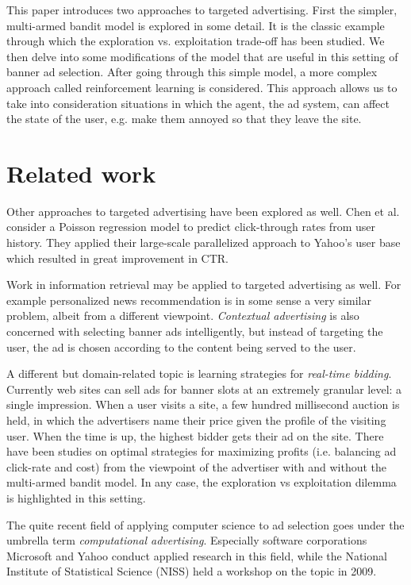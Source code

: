 \documentclass{article} %
\begin{document}

This paper introduces two approaches to targeted advertising. First the
simpler, multi-armed bandit model is explored in some detail. It is the classic
example through which the exploration vs.  exploitation trade-off has been
studied. We then delve into some modifications of the model that are useful in
this setting of banner ad selection. After going through this simple model, a
more complex approach called reinforcement learning is considered. This
approach allows us to take into consideration situations in which the agent,
the ad system, can affect the state of the user, e.g. make them annoyed so that
they leave the site.

\section{Related work}

Other approaches to targeted advertising have been explored as well. Chen et
al. \cite{chen2009large} consider a Poisson regression model to predict
click-through rates from user history.  They applied their large-scale
parallelized approach to Yahoo's user base which resulted in great improvement
in CTR.

Work in information retrieval may be applied to targeted advertising as well.
For example personalized news recommendation is in some sense a very similar
problem, albeit from a different viewpoint. \emph{Contextual advertising} is
also concerned with selecting banner ads intelligently, but instead of
targeting the user, the ad is chosen according to the content being served to
the user.

A different but domain-related topic is learning strategies for
\emph{real-time bidding}. Currently web sites can sell ads for banner slots at
an extremely granular level: a single impression. When a user visits a site, a
few hundred millisecond auction is held, in which the advertisers name their
price given the profile of the visiting user. When the time is up, the highest
bidder gets their ad on the site. There have been studies on optimal strategies
for maximizing profits (i.e. balancing ad click-rate and cost) from the
viewpoint of the advertiser with \cite{ding2013multi} and without
\cite{chakraborty2010selective} the multi-armed bandit model. In any case, the
exploration vs exploitation dilemma is highlighted in this setting.

The quite recent field of applying computer science to ad selection goes under
the umbrella term \emph{computational advertising}. Especially software
corporations Microsoft and Yahoo conduct applied research in this field, while
the National Institute of Statistical Science (NISS) held a workshop on the
topic in 2009. %
\end{document}

